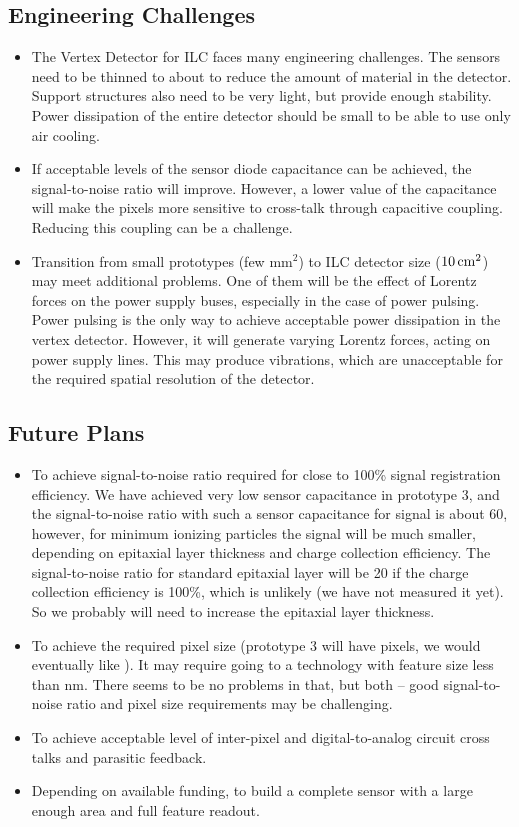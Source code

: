 \subsection{Engineering Challenges}
\begin{itemize}
    \item The Vertex Detector for ILC faces many engineering challenges. The sensors need to be thinned to about \unit[50]{\micron} to reduce the amount of material in the detector. Support structures also need to be very light, but provide enough stability. Power dissipation of the entire detector should be small to be able to use only air cooling.
    \item If acceptable levels of the sensor diode capacitance can be achieved, the signal-to-noise ratio will improve. However, a lower value of the capacitance will make the pixels more sensitive to cross-talk through capacitive coupling. Reducing this coupling can be a challenge.
    \item Transition from small prototypes (few $\text{mm}^{2}$) to ILC detector size (\approx $\unit[10]{cm^2}$) may meet additional problems. One of them will be the effect of Lorentz forces on the power supply buses, especially in the case of power pulsing. Power pulsing is the only way to achieve acceptable power dissipation in the vertex detector. However, it will generate varying Lorentz forces, acting on power supply lines. This may produce vibrations, which are unacceptable for the required spatial resolution of the detector.
\end{itemize}

\subsection{Future Plans}
\begin{itemize}
    \item To achieve signal-to-noise ratio required for close to 100\% signal registration efficiency. We have achieved very low sensor capacitance in prototype 3, and the signal-to-noise ratio with such a sensor capacitance for  signal is about 60, however, for minimum ionizing particles the signal will be much smaller, depending on epitaxial layer thickness and charge collection efficiency. The signal-to-noise ratio for standard \unit[7]{\micron} epitaxial layer will be 20 if the charge collection efficiency is 100\%, which is unlikely (we have not measured it yet). So we probably will need to increase the epitaxial layer thickness.
    \item To achieve the required pixel size (prototype 3 will have \unit[25]{\micron} pixels, we would eventually like \unit[15]{\micron}). It may require going to a technology with feature size less than \unit[65]{nm}. There seems to be no problems in that, but both -- good signal-to-noise ratio and pixel size requirements may be challenging.
    \item To achieve acceptable level of inter-pixel and digital-to-analog circuit cross talks and parasitic feedback.
    \item Depending on available funding, to build a complete sensor with a large enough area and full feature readout.
\end{itemize}


